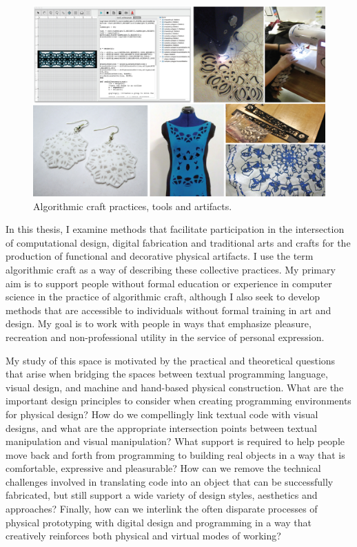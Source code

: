 \begin{center}
 \begin{figure}[h!]
\includegraphics[width=\columnwidth]{images/intro_pic.jpg}
\caption{Algorithmic craft practices, tools and artifacts. }
\label{fig:intro}
\end{figure}
\end{center}

In this thesis, I examine methods that facilitate participation in the intersection of computational design, digital fabrication and traditional arts and crafts for the production of functional and decorative physical artifacts. I use the term algorithmic craft as a way of describing these collective practices. My primary aim is to support people without formal education or experience in computer science in the practice of algorithmic craft, although I also seek to develop methods that are accessible to individuals without formal training in art and design. My goal is to work with people in ways that emphasize pleasure, recreation and non-professional utility in the service of personal expression. 

My study of this space is motivated by the practical and theoretical questions that arise when bridging the spaces between textual programming language, visual design, and machine and hand-based physical construction. What are the important design principles to consider when creating programming environments for physical design? How do we compellingly link textual code with visual designs, and what are the appropriate intersection points between textual manipulation and visual manipulation? What support is required to help people move back and forth from programming to building real objects in a way that is comfortable, expressive and pleasurable? How can we remove the technical challenges involved in translating code into an object that can be successfully fabricated, but still support a wide variety of design styles, aesthetics and approaches? Finally, how can we interlink the often disparate processes of physical prototyping with digital design and programming in a way that creatively reinforces both physical and virtual modes of working?

